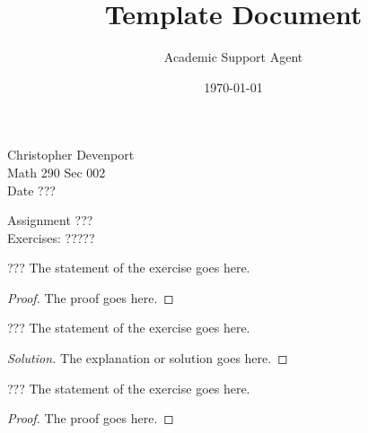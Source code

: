\documentclass{article}
\title{Template Document}
\author{Academic Support Agent}
\date{\today}
\begin{document}
\maketitle

\begin{flushright}
\sc Christopher Devenport  \\
Math 290 Sec 002\\
Date ???
\end{flushright}
\bigskip


\begin{center}
\textsf{Assignment ???} \\
\textsf{Exercises: ?????}
\end{center}


\begin{exercise}{???}
The statement of the exercise goes here.
\end{exercise}

\begin{proof}
The proof goes here.
\end{proof}



\begin{exercise}{???}
The statement of the exercise goes here.
\end{exercise}

\begin{proof}[Solution]
The explanation or solution goes here.
\end{proof}



\begin{exercise}{???}
The statement of the exercise goes here.
\end{exercise}

\begin{proof}
The proof goes here.
\end{proof}


\end{document}
